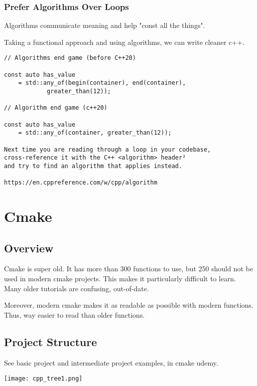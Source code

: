 \documentclass[openany]{report}
\begin{document}
\subsection{Prefer Algorithms Over Loops}

Algorithms communicate meaning and help "const all the things".

Taking a functional approach and using algorithms, we can write cleaner c++.

\begin{verbatim}
// Algorithms end game (before C++20)

const auto has_value
    = std::any_of(begin(container), end(container), 
            greater_than(12));

// Algorithm end game (c++20)

const auto has_value
    = std::any_of(container, greater_than(12));

Next time you are reading through a loop in your codebase,
cross-reference it with the C++ <algorithm> header²
and try to find an algorithm that applies instead.

https://en.cppreference.com/w/cpp/algorithm
\end{verbatim}
\chapter{Cmake}


\section{Overview}

Cmake is super old. It has more than 300 functions to use, but 250 should not be used in modern cmake projects. 
This makes it particularly difficult to learn. Many older tutorials are confusing, out-of-date.

Moreover, modern cmake makes it as readable as possible with modern functions. Thus, way easier to read than older
functions.

\section{Project Structure}

See basic project and intermediate project examples, in cmake udemy.


\begin{center}
    \texttt{[image: cpp\_tree1.png]}
\end{center}
\end{document}
